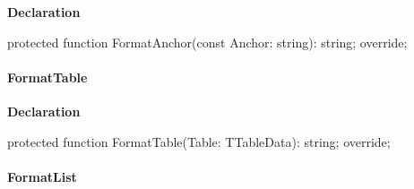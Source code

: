 \documentclass{report}
\newif\ifpdf
\begin{document}
\label{PasDoc_GenSimpleXML.TSimpleXMLDocGenerator-FormatAnchor}
\begin{list}{}{
\setlength{\itemindent}{0cm}
\setlength{\listparindent}{0cm}
\setlength{\leftmargin}{\evensidemargin}
\addtolength{\leftmargin}{\tmplength}
\settowidth{\labelsep}{X}
\addtolength{\leftmargin}{\labelsep}
\setlength{\labelwidth}{\tmplength}
}
\item[\textbf{Declaration}\hfill]
\ifpdf
\begin{flushleft}
\fi
\begin{ttfamily}
protected function FormatAnchor(const Anchor: string): string; override;\end{ttfamily}

\ifpdf
\end{flushleft}
\fi

\end{list}
\paragraph*{FormatTable}\hspace*{\fill}

\label{PasDoc_GenSimpleXML.TSimpleXMLDocGenerator-FormatTable}
\begin{list}{}{
\setlength{\itemindent}{0cm}
\setlength{\listparindent}{0cm}
\setlength{\leftmargin}{\evensidemargin}
\addtolength{\leftmargin}{\tmplength}
\settowidth{\labelsep}{X}
\addtolength{\leftmargin}{\labelsep}
\setlength{\labelwidth}{\tmplength}
}
\item[\textbf{Declaration}\hfill]
\ifpdf
\begin{flushleft}
\fi
\begin{ttfamily}
protected function FormatTable(Table: TTableData): string; override;\end{ttfamily}

\ifpdf
\end{flushleft}
\fi

\end{list}
\paragraph*{FormatList}\hspace*{\fill}
\end{document}
